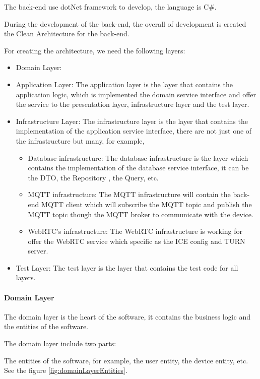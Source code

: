 The back-end use dotNet framework to develop, the language is C\#.

During the development of the back-end, the overall of development is created 
the Clean Architecture for the back-end.

For creating the architecture, we need the following layers:
\begin{itemize}
    \item Domain Layer: 
    \item Application Layer: The application layer is the layer that contains
    the application logic, which is implemented the domain service interface
    and offer the service to the presentation layer, infrastructure layer and the test layer.
    \item Infrastructure Layer: The infrastructure layer is the layer that
    contains the implementation of the application service interface, 
    there are not just one of the infrastructure but many, for example,
    \begin{itemize}
        \item Database infrastructure: The database infrastructure is the layer which
        contains the implementation of the database service interface,
        it can be the DTO, the Repository , the Query, etc.
        \item MQTT infrastructure: The MQTT infrastructure will contain the back-end MQTT client which 
        will subscribe the MQTT topic and publish the MQTT topic though the MQTT broker to communicate
        with the device.
        \item WebRTC's infrastructure: The WebRTC infrastructure is working for offer the WebRTC service
        which specific as the ICE config and TURN server.
    \end{itemize} 
    \item Test Layer: The test layer is the layer that contains the test code for all layers.
\end{itemize}

\paragraph{Domain Layer}
The domain layer is the heart of the software, 
it contains the business logic and the entities of the software.

The domain layer include two parts:

The entities of the software, for example, the user entity, the device entity, etc. 
See the figure \ref{fig:domainLayerEntities}.

